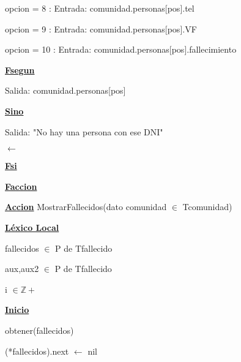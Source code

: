 \documentclass{article}
\begin{document}
                    \hspace{20mm}opcion = 8 : Entrada: comunidad.personas[pos].tel
                    
                    \hspace{20mm}opcion = 9 : Entrada: comunidad.personas[pos].VF
                    
                    \hspace{20mm}opcion = 10 : Entrada: comunidad.personas[pos].fallecimiento

                \hspace{16mm}\underline{\textbf{Fsegun}}
                
                \hspace{16mm}Salida: comunidad.personas[pos]

            \hspace{12mm}\underline{\textbf{Sino}}

                \hspace{16mm}Salida: "No hay una persona con ese DNI"

                \hspace{16mm}$\leftarrow$

            \hspace{12mm}\underline{\textbf{Fsi}}

    \hspace{4mm}\underline{\textbf{Faccion}}

    \vspace{4mm}

    \hspace{4mm}\underline{\textbf{Accion}} MostrarFallecidos(dato comunidad $\in$ Tcomunidad)

        \hspace{8mm}\underline{\textbf{Léxico Local}}

            \hspace{12mm}fallecidos $\in$ P de Tfallecido

            \hspace{12mm}aux,aux2 $\in$ P de Tfallecido

            \hspace{12mm}i $\in \mathbb{Z}+$

        \hspace{8mm}\underline{\textbf{Inicio}}

            \hspace{12mm}obtener(fallecidos)

            \hspace{12mm}(*fallecidos).next $\leftarrow$ nil
\end{document}
